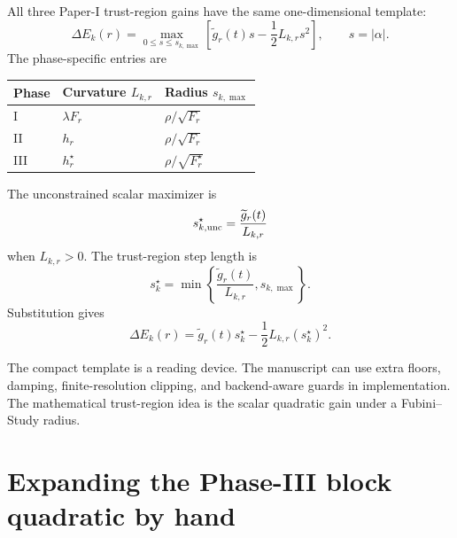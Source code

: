 \documentclass[10pt,twocolumn]{article}
\begin{document}
All three Paper-I trust-region gains have the same one-dimensional template:
\begin{equation}
\Delta E_k(r)
=
\max_{0\le s\le s_{k,\max}}
\left[
\widetilde g_r(t)s-\frac12L_{k,r}s^2
\right],
\qquad s=|\alpha|.
\label{eq:shared_template}
\end{equation}
The phase-specific entries are
\begin{center}
\footnotesize
\begin{tabular}{>{\raggedright\arraybackslash}p{}
>{\raggedright\arraybackslash}p{}
>{\raggedright\arraybackslash}p{}}
\toprule
Phase & Curvature \(L_{k,r}\) & Radius \(s_{k,\max}\)\\
\midrule
I & \(\lambda F_r\) & \(\rho/\sqrt{F_r}\)\\
II & \(h_r\) & \(\rho/\sqrt{F_r}\)\\
III & \(h_r^\star\) & \(\rho/\sqrt{F_r^\star}\)\\
\bottomrule
\end{tabular}
\end{center}
The unconstrained scalar maximizer is
\begin{equation}
s_{k,{\rm unc}}^\star=\frac{\widetilde g_r(t)}{L_{k,r}}
\label{eq:shared_uncon}
\end{equation}
when \(L_{k,r}>0\). The trust-region step length is
\begin{equation}
s_k^\star
=
\min\left\{
\frac{\widetilde g_r(t)}{L_{k,r}},
s_{k,\max}
\right\}.
\label{eq:shared_step}
\end{equation}
Substitution gives
\begin{equation}
\Delta E_k(r)
=
\widetilde g_r(t)s_k^\star
-\frac12L_{k,r}(s_k^\star)^2.
\label{eq:shared_gain_closed}
\end{equation}

\begin{cautionbox}
The compact template is a reading device. The manuscript can use extra floors, damping, finite-resolution clipping, and backend-aware guards in implementation. The mathematical trust-region idea is the scalar quadratic gain under a Fubini--Study radius.
\end{cautionbox}

\section{Expanding the Phase-III block quadratic by hand}
\end{document}
